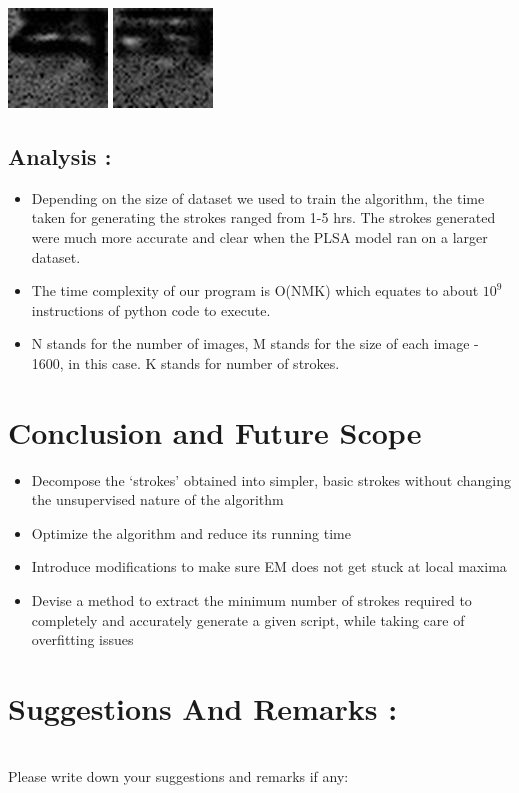 \documentclass[10pt]{article}
\begin{document}
\begin{center}
				\includegraphics{stro8.jpg}
				\includegraphics{stro9.jpg}
			\end{center}
		\subsection{Analysis :}
			\begin{itemize}
				\item 
				Depending on the size of dataset we used to train the algorithm, the time taken for generating the strokes ranged from 1-5 hrs. The strokes generated were much more accurate and clear when the PLSA model ran on a larger dataset.
				\item
				The time complexity of our program is O(NMK) which equates to about $10^{9}$ instructions of python code to execute.
				\item
				N stands for the number of images, M stands for the size of each image - 1600, in this case. K stands for number of strokes.
			\end{itemize}
	\newpage
	\section{Conclusion and Future Scope}
		\hrulefill
		\begin{itemize}
			\item 
			Decompose the ‘strokes’ obtained into simpler, basic strokes without changing the unsupervised nature of the algorithm
			\item
			Optimize the algorithm and reduce its running time
			\item
			Introduce modifications to make sure EM does not get stuck at local maxima
			\item
			Devise a method to extract the minimum number of strokes required to completely and accurately generate a given script, while taking care of overfitting issues
		\end{itemize}
	\newpage
	\printbibliography
	\newpage
	\section{Suggestions And Remarks :}
		\hrulefill\\
		\Large Please write down your suggestions and remarks if any:	
\end{document}
